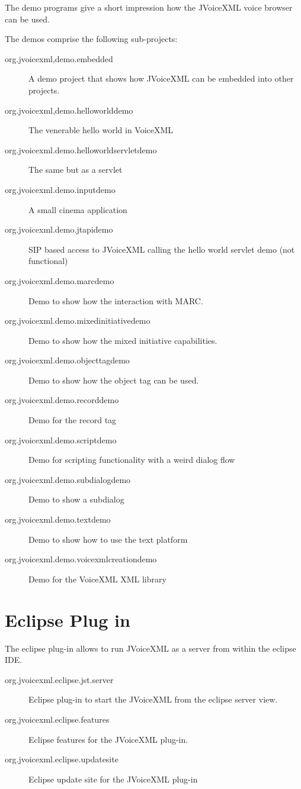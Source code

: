 \documentclass[11pt,a4paper]{article}
\begin{document}
The demo programs give a short impression how the JVoiceXML voice browser can
be used.

The demos comprise the following sub-projects:

\begin{description}
\item[org.jvoicexml,demo.embedded] A demo project that shows how JVoiceXML can
be embedded into other projects.
\item[org.jvoicexml,demo.helloworlddemo] The venerable hello world in Voice\-XML
\item[org.jvoicexml.demo.helloworldservletdemo] The same but as a servlet
\item[org.jvoicexml.demo.inputdemo] A small cinema application
\item[org.jvoicexml.demo.jtapidemo] SIP based access to JVoiceXML calling the
hello world servlet demo (not functional)
\item[org.jvoicexml.demo.marcdemo] Demo to show how the interaction with MARC.
\item[org.jvoicexml.demo.mixedinitiativedemo] Demo to show how the mix\-ed
initiative capabilities.
\item[org.jvoicexml.demo.objecttagdemo] Demo to show how the object tag can be
used.
\item[org.jvoicexml.demo.recorddemo] Demo for the record tag
\item[org.jvoicexml.demo.scriptdemo] Demo for scripting functionality with a
weird dialog flow
\item[org.jvoicexml.demo.subdialogdemo] Demo to show a subdialog
\item[org.jvoicexml.demo.textdemo] Demo to show how to use the text platform
\item[org.jvoicexml.demo.voicexmlcreationdemo] Demo for the VoiceXML XML library
\end{description}

\section{Eclipse Plug in}

The eclipse plug-in allows to run JVoiceXML as a server from within the eclipse
IDE.

\begin{description}
\item[org.jvoicexml.eclipse.jst.server] Eclipse plug-in to start the JVoiceXML
from the eclipse server view.
\item[org.jvoicexml.eclipse.features] Eclipse features for the JVoiceXML
plug-in.
\item[org.jvoicexml.eclipse.updatesite] Eclipse update site for the
JVoiceXML plug-in
\end{description}
\end{document}
